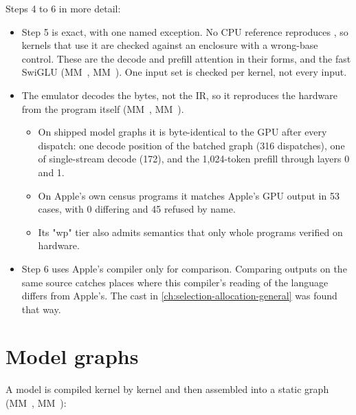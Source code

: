 Steps 4 to 6 in more detail:

\begin{itemize}
\item Step 5 is exact, with one named exception. No CPU reference reproduces , so kernels that
  use it are checked against an enclosure with a wrong-base control. These are the decode and prefill attention in
  their  forms, and the fast SwiGLU (MM~, MM~). One input set is checked per kernel, not
  every input.
\item The emulator decodes the bytes, not the IR, so it reproduces the hardware from the program itself (MM~,
  MM~).

  \begin{itemize}
  \item On shipped model graphs it is byte-identical to the GPU after every dispatch: one decode position of the
  batched graph (316 dispatches), one of single-stream decode (172), and the 1,024-token prefill through layers
  0 and 1.
  \item On Apple's own census programs it matches Apple's GPU output in 53 cases, with 0 differing and 45 refused by
  name.
  \item Its "wp" tier also admits semantics that only whole programs verified on hardware.
  \end{itemize}
\item Step 6 uses Apple's compiler only for comparison. Comparing outputs on the same source catches places where
  this compiler's reading of the language differs from Apple's. The cast in \cref{ch:selection-allocation-general} was found that way.
\end{itemize}

\section{Model graphs}\label{ch:model-graphs}

A model is compiled kernel by kernel and then assembled into a static graph (MM~, MM~):

